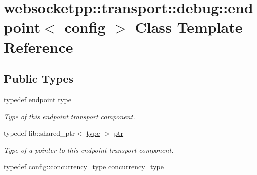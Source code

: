 \hypertarget{classwebsocketpp_1_1transport_1_1debug_1_1endpoint}{}\section{websocketpp\+:\+:transport\+:\+:debug\+:\+:endpoint$<$ config $>$ Class Template Reference}
\label{classwebsocketpp_1_1transport_1_1debug_1_1endpoint}
\subsection*{Public Types}
\begin{DoxyCompactItemize}
\item 
typedef \hyperlink{classwebsocketpp_1_1transport_1_1debug_1_1endpoint}{endpoint} \hyperlink{classwebsocketpp_1_1transport_1_1debug_1_1endpoint_ad8bdfc73f0351c08dbe64143cd224ac0}{type}\hypertarget{classwebsocketpp_1_1transport_1_1debug_1_1endpoint_ad8bdfc73f0351c08dbe64143cd224ac0}{}\label{classwebsocketpp_1_1transport_1_1debug_1_1endpoint_ad8bdfc73f0351c08dbe64143cd224ac0}

\begin{DoxyCompactList}\small\item\em Type of this endpoint transport component. \end{DoxyCompactList}\item 
typedef lib\+::shared\+\_\+ptr$<$ \hyperlink{classwebsocketpp_1_1transport_1_1debug_1_1endpoint_ad8bdfc73f0351c08dbe64143cd224ac0}{type} $>$ \hyperlink{classwebsocketpp_1_1transport_1_1debug_1_1endpoint_a947f3252f16c34680638f0ed9ef95aa3}{ptr}\hypertarget{classwebsocketpp_1_1transport_1_1debug_1_1endpoint_a947f3252f16c34680638f0ed9ef95aa3}{}\label{classwebsocketpp_1_1transport_1_1debug_1_1endpoint_a947f3252f16c34680638f0ed9ef95aa3}

\begin{DoxyCompactList}\small\item\em Type of a pointer to this endpoint transport component. \end{DoxyCompactList}\item 
typedef \hyperlink{classwebsocketpp_1_1concurrency_1_1none}{config\+::concurrency\+\_\+type} \hyperlink{classwebsocketpp_1_1transport_1_1debug_1_1endpoint_adbe41c60a84f148cbdce15a0535ac2e9}{concurrency\+\_\+type}\hypertarget{classwebsocketpp_1_1transport_1_1debug_1_1endpoint_adbe41c60a84f148cbdce15a0535ac2e9}{}\label{classwebsocketpp_1_1transport_1_1debug_1_1endpoint_adbe41c60a84f148cbdce15a0535ac2e9}


\end{DoxyCompactItemize}

